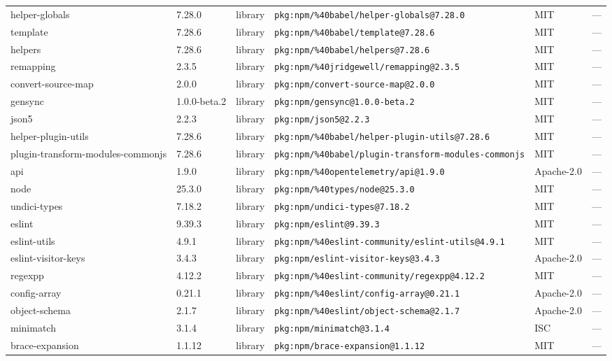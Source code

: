\documentclass[11pt]{article}
\begin{document}
\begin{longtable}{|l|l|l|p{2.2cm}|l|p{4cm}|}
helper-globals & 7.28.0 & library & \texttt{pkg:npm/\%40babel/helper-globals@7.28.0} & MIT & — \\
template & 7.28.6 & library & \texttt{pkg:npm/\%40babel/template@7.28.6} & MIT & — \\
helpers & 7.28.6 & library & \texttt{pkg:npm/\%40babel/helpers@7.28.6} & MIT & — \\
remapping & 2.3.5 & library & \texttt{pkg:npm/\%40jridgewell/remapping@2.3.5} & MIT & — \\
convert-source-map & 2.0.0 & library & \texttt{pkg:npm/convert-source-map@2.0.0} & MIT & — \\
gensync & 1.0.0-beta.2 & library & \texttt{pkg:npm/gensync@1.0.0-beta.2} & MIT & — \\
json5 & 2.2.3 & library & \texttt{pkg:npm/json5@2.2.3} & MIT & — \\
helper-plugin-utils & 7.28.6 & library & \texttt{pkg:npm/\%40babel/helper-plugin-utils@7.28.6} & MIT & — \\
plugin-transform-modules-commonjs & 7.28.6 & library & \texttt{pkg:npm/\%40babel/plugin-transform-modules-commonjs} & MIT & — \\
api & 1.9.0 & library & \texttt{pkg:npm/\%40opentelemetry/api@1.9.0} & Apache-2.0 & — \\
node & 25.3.0 & library & \texttt{pkg:npm/\%40types/node@25.3.0} & MIT & — \\
undici-types & 7.18.2 & library & \texttt{pkg:npm/undici-types@7.18.2} & MIT & — \\
eslint & 9.39.3 & library & \texttt{pkg:npm/eslint@9.39.3} & MIT & — \\
eslint-utils & 4.9.1 & library & \texttt{pkg:npm/\%40eslint-community/eslint-utils@4.9.1} & MIT & — \\
eslint-visitor-keys & 3.4.3 & library & \texttt{pkg:npm/eslint-visitor-keys@3.4.3} & Apache-2.0 & — \\
regexpp & 4.12.2 & library & \texttt{pkg:npm/\%40eslint-community/regexpp@4.12.2} & MIT & — \\
config-array & 0.21.1 & library & \texttt{pkg:npm/\%40eslint/config-array@0.21.1} & Apache-2.0 & — \\
object-schema & 2.1.7 & library & \texttt{pkg:npm/\%40eslint/object-schema@2.1.7} & Apache-2.0 & — \\
minimatch & 3.1.4 & library & \texttt{pkg:npm/minimatch@3.1.4} & ISC & — \\
brace-expansion & 1.1.12 & library & \texttt{pkg:npm/brace-expansion@1.1.12} & MIT & — \\

\end{longtable}
\end{document}
